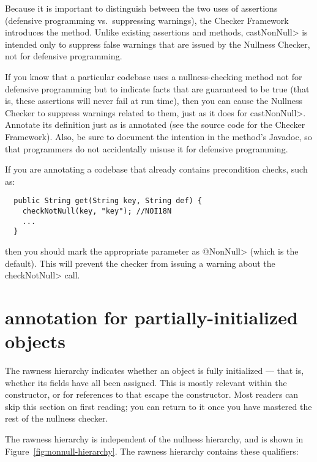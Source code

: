 Because it is important to distinguish between the two uses of assertions
(defensive programming vs.~suppressing warnings), the Checker Framework
introduces the  method.
Unlike existing assertions and
methods, \<castNonNull> is intended only to suppress false warnings that are
issued by the Nullness Checker, not for defensive programming.

If you know that a particular codebase uses
a nullness-checking method not for defensive programming but to indicate
facts that are guaranteed to be true (that is, these assertions will never
fail at run time), then you can cause the Nullness Checker to suppress
warnings related to them, just as it does for \<castNonNull>.
Annotate its definition just as
 is annotated (see the
source code for the Checker Framework).
Also, be sure to document the intention in the method's Javadoc, so that
programmers do not
accidentally misuse it for defensive programming.


If you are annotating a codebase that already contains precondition checks,
such as:

\begin{Verbatim}
  public String get(String key, String def) {
    checkNotNull(key, "key"); //NOI18N
    ...
  }
\end{Verbatim}

\noindent
then you should mark the appropriate parameter as \<@NonNull> (which is the
default).  This will prevent the checker from issuing a warning about the
\<checkNotNull> call.


\section{ annotation for partially-initialized objects\label{raw-partially-initialized}}

The rawness hierarchy indicates whether an object is fully initialized ---
that is, whether its fields have all been assigned.  This is mostly
relevant within the constructor, or for references to  that
escape the constructor.  Most readers can skip this section on first
reading; you can return to it once you have mastered the rest of the
nullness checker.

The rawness hierarchy is independent of the
nullness hierarchy, and is shown in Figure~\ref{fig:nonnull-hierarchy}.
The rawness hierarchy contains these qualifiers:


